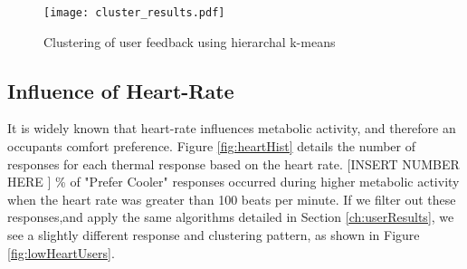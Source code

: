 
\begin{figure}
\begin{center}
\texttt{[image: cluster\_results.pdf]}
\caption{Clustering of user feedback using hierarchal k-means}
\label{fig:clustering}
\end{center}
\end{figure}






\subsection{Influence of Heart-Rate}

It is widely known that heart-rate influences metabolic activity, and therefore an occupants comfort preference. Figure \ref{fig:heartHist} details the number of responses for each thermal response based on the heart rate. [INSERT NUMBER HERE ] \% of "Prefer Cooler" responses occurred during higher metabolic activity when the heart rate was greater than 100 beats per minute. If we filter out these responses,and apply the same algorithms detailed in Section \ref{ch:userResults}, we see a slightly different response and clustering pattern, as shown in Figure \ref{fig:lowHeartUsers}. 



